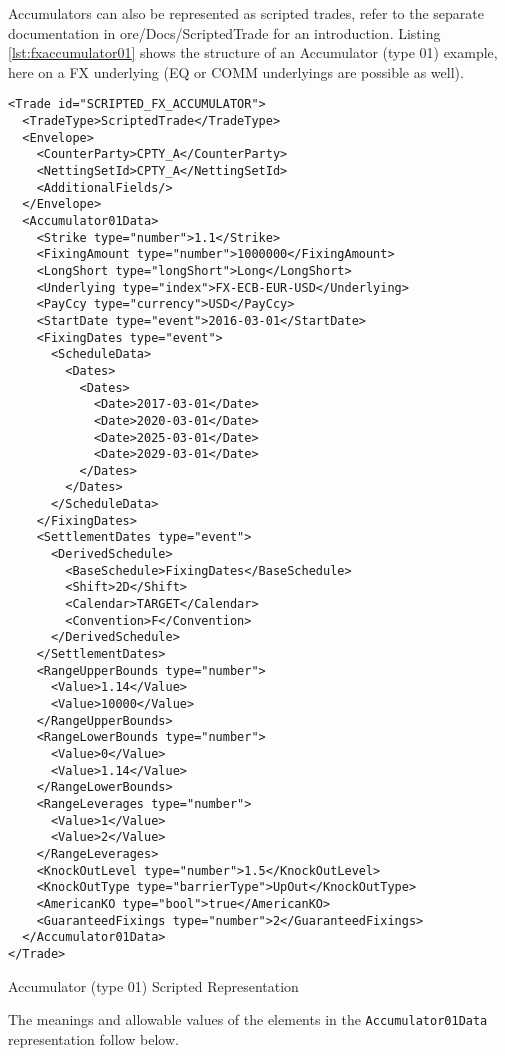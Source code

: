 
Accumulators can also be represented as scripted trades, refer to the separate documentation in ore/Docs/ScriptedTrade for an
introduction. Listing \ref{lst:fxaccumulator01} shows the structure of an Accumulator (type 01) example, here on a FX
underlying (EQ or COMM underlyings are possible as well).

\begin{listing}[H]
\begin{verbatim}
<Trade id="SCRIPTED_FX_ACCUMULATOR">
  <TradeType>ScriptedTrade</TradeType>
  <Envelope>
    <CounterParty>CPTY_A</CounterParty>
    <NettingSetId>CPTY_A</NettingSetId>
    <AdditionalFields/>
  </Envelope>
  <Accumulator01Data>
    <Strike type="number">1.1</Strike>
    <FixingAmount type="number">1000000</FixingAmount>
    <LongShort type="longShort">Long</LongShort>
    <Underlying type="index">FX-ECB-EUR-USD</Underlying>
    <PayCcy type="currency">USD</PayCcy>
    <StartDate type="event">2016-03-01</StartDate>
    <FixingDates type="event">
      <ScheduleData>
        <Dates>
          <Dates>
            <Date>2017-03-01</Date>
            <Date>2020-03-01</Date>
            <Date>2025-03-01</Date>
            <Date>2029-03-01</Date>
          </Dates>
        </Dates>
      </ScheduleData>
    </FixingDates>
    <SettlementDates type="event">
      <DerivedSchedule>
        <BaseSchedule>FixingDates</BaseSchedule>
        <Shift>2D</Shift>
        <Calendar>TARGET</Calendar>
        <Convention>F</Convention>
      </DerivedSchedule>
    </SettlementDates>
    <RangeUpperBounds type="number">
      <Value>1.14</Value>
      <Value>10000</Value>
    </RangeUpperBounds>
    <RangeLowerBounds type="number">
      <Value>0</Value>
      <Value>1.14</Value>
    </RangeLowerBounds>
    <RangeLeverages type="number">
      <Value>1</Value>
      <Value>2</Value>
    </RangeLeverages>
    <KnockOutLevel type="number">1.5</KnockOutLevel>
    <KnockOutType type="barrierType">UpOut</KnockOutType>
    <AmericanKO type="bool">true</AmericanKO>
    <GuaranteedFixings type="number">2</GuaranteedFixings>
  </Accumulator01Data>
</Trade>
\end{verbatim}
\caption{Accumulator (type 01) Scripted Representation}
\label{lst:fxaccumulator01}
\end{listing}

The meanings and allowable values of the elements in the \verb+Accumulator01Data+ representation follow below.

